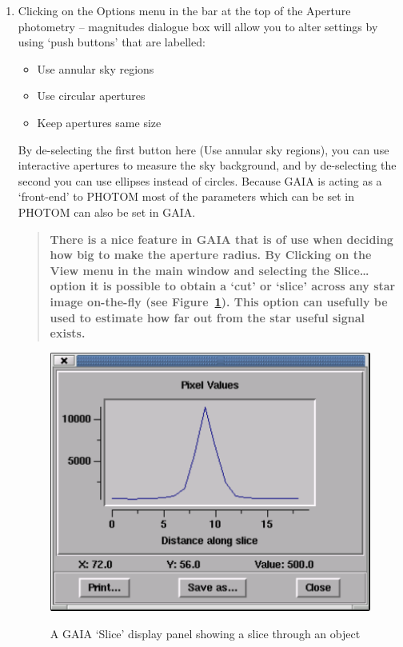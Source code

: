 \documentclass[twoside,11pt]{article}
\begin{document}
\begin{enumerate}
  \item Clicking on the {\sf Options} menu in the bar at the top of the
   {\sf Aperture photometry -- magnitudes} dialogue box will allow you to
   alter settings by using `push buttons' that are labelled:

  \begin{itemize}

     \item {\sf Use annular sky regions}

     \item {\sf Use circular apertures}

     \item {\sf Keep apertures same size}

  \end{itemize}

   By de-selecting the first button here ({\sf Use annular sky
   regions}), you can use interactive apertures to measure the sky
   background, and by de-selecting the second you can use ellipses
   instead of circles.  Because GAIA is acting as a `front-end' to
   PHOTOM most of the parameters which can be set in PHOTOM can also
   be set in GAIA.

  \begin{quote}
   {\bf There is a nice feature in GAIA that is of use when deciding how
   big to make the aperture radius. By Clicking on the {\sf View} menu
   in the main window and selecting the {\sf Slice\ldots} option it is
   possible to obtain a `cut' or `slice' across any star image on-the-fly
   (see Figure~\ref{g6}).  This option can usefully be used to estimate
   how far out from the star useful signal exists.}
  \end{quote}

  \begin{figure}[htbp]
     \centering
     \includegraphics[totalheight=3.25in]{sc6_gaia3}
     \begin{quote}
     \caption[A GAIA `{\sf Slice}' display panel]
      {A GAIA `{\sf Slice}' display panel showing a slice through an object
     \label{g6} }
     \end{quote}
  \end{figure}


\end{enumerate}
\end{document}
